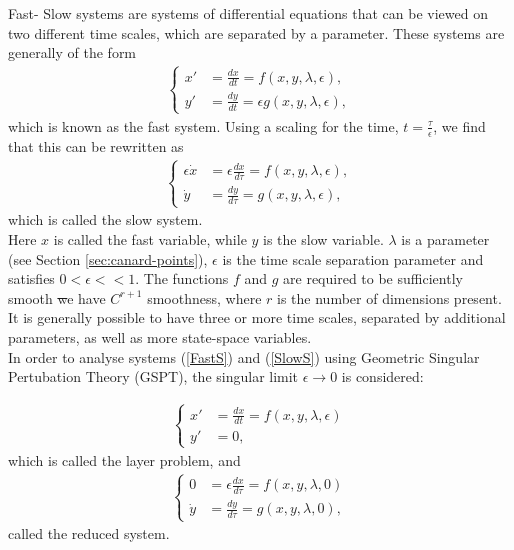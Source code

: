 
Fast- Slow systems are systems of differential equations that can be viewed on two different time scales, which are separated by a parameter.
These systems are generally of the form
\begin{align} 
\begin{cases}
x' &=\frac{dx}{dt}= f(x,y,\lambda, \epsilon),\\
y' &= \frac{dy}{dt}= \epsilon g( x,y, \lambda, \epsilon),
\end{cases}\label{FastS}
\end{align}
which is known as the fast system.
Using a scaling for the time, $t = \frac{\tau}{\epsilon} $, we find that this can be rewritten as
\begin{align}
\begin{cases}
\epsilon \dot{x} &= \epsilon \frac{dx}{d \tau} = f(x,y,\lambda, \epsilon),\\
\dot{y} & = \frac{dy}{d \tau} =  g( x,y, \lambda, \epsilon),
\end{cases}\label{SlowS}
\end{align}
which is called the slow system.\\

Here $x$ is called the fast variable, while $y$ is the slow variable. $\lambda$ is a parameter (see Section \ref{sec:canard-points}), $\epsilon$ is the time scale separation parameter and satisfies $0< \epsilon << 1$. The functions $f$ and $g$ are required to be sufficiently smooth \st we have $ C^{r+1} $ smoothness, where $ r $ is the number of dimensions present. It is generally possible to have three or more time scales, separated by additional parameters, as well as more state-space variables. \\

In order to analyse systems (\ref{FastS}) and (\ref{SlowS}) using Geometric Singular Pertubation Theory (GSPT), the singular limit $\epsilon \to 0$ is considered:

\begin{align} \label{FastS0}
\begin{cases}
x' &=\frac{dx}{dt}= f(x,y,\lambda, \epsilon)\\
y' &= 0,
\end{cases}
\end{align}
which is called the layer problem, and
\begin{align}\label{SlowS0}
\begin{cases}
0 &= \epsilon \frac{dx}{d \tau} = f(x,y,\lambda, 0)\\
\dot{y} & = \frac{dy}{d \tau} =  g( x,y, \lambda,0),
\end{cases}
\end{align}
called the reduced system.\\

